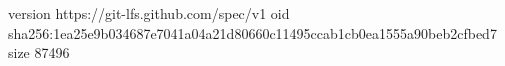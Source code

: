 version https://git-lfs.github.com/spec/v1
oid sha256:1ea25e9b034687e7041a04a21d80660c11495ccab1cb0ea1555a90beb2cfbed7
size 87496
